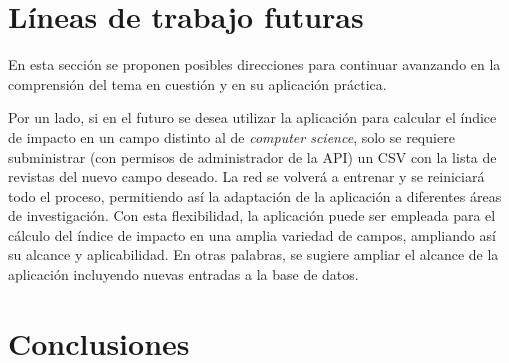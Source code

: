 


\section{Líneas de trabajo futuras}
En esta sección se proponen posibles direcciones para continuar avanzando en la comprensión del tema en cuestión y en su aplicación práctica.

Por un lado, si en el futuro se desea utilizar la aplicación para calcular el índice de impacto en un campo distinto al de \textit{computer science}, solo se requiere subministrar (con permisos de administrador de la API) un CSV con la lista de revistas del nuevo campo deseado. La red se volverá a entrenar y se reiniciará todo el proceso, permitiendo así la adaptación de la aplicación a diferentes áreas de investigación. Con esta flexibilidad, la aplicación puede ser empleada para el cálculo del índice de impacto en una amplia variedad de campos, ampliando así su alcance y aplicabilidad. 
En otras palabras, se sugiere ampliar el alcance de la aplicación incluyendo nuevas entradas a la base de datos.


\section{Conclusiones}

